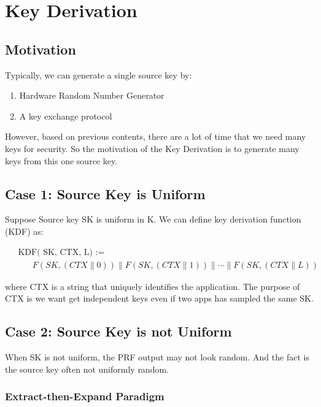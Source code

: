 \section{Key Derivation}

\subsection{Motivation}

Typically, we can generate a single source key by:

\begin{enumerate}
    \item Hardware Random Number Generator
    \item A key exchange protocol
\end{enumerate}

However, based on previous contents, there are a lot of time that we need many keys for security. So the motivation of the Key Derivation is to generate many keys from this one source key.

\subsection{Case 1: Source Key is Uniform}

Suppose Source key SK is uniform in K. We can define key derivation function (KDF) as:

\begin{equation}
    \begin{aligned}
    &\text { KDF( SK, CTX, L) := } \\
    &\qquad F(S K,(C T X \| 0))\|F(S K,(C T X \| 1))\| \cdots \| F(S K,(C T X \| L))
    \end{aligned}
\end{equation}

where CTX is a string that uniquely identifies the application. The purpose of CTX is we want get independent keys even if two apps has sampled the same SK.

\subsection{Case 2: Source Key is not Uniform}

When SK is not uniform, the PRF output may not look random. And the fact is the source key often not uniformly random.

\subsubsection{Extract-then-Expand Paradigm}

